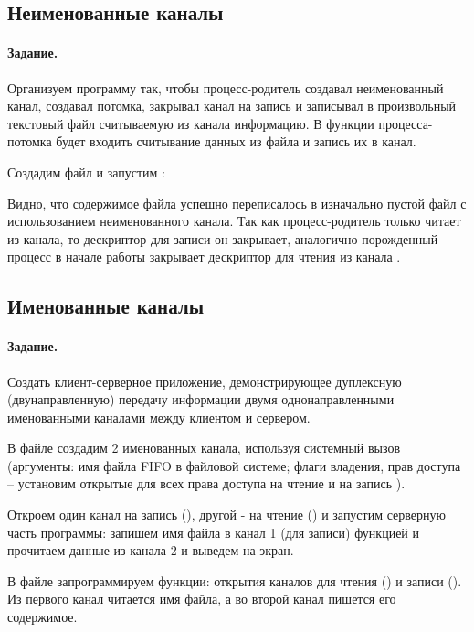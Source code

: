 \subsection{Неименованные каналы}

\paragraph{Задание.} Организуем программу  так, чтобы процесс-родитель создавал неименованный канал, создавал потомка, закрывал канал на запись и записывал в произвольный текстовый файл считываемую из канала информацию. В функции процесса-потомка будет входить считывание данных из файла и запись их в канал.


Создадим файл  и запустим :


Видно, что содержимое файла  успешно переписалось в изначально пустой файл  с использованием неименованного канала. Так как процесс-родитель только читает из канала, то дескриптор для записи  он закрывает, аналогично порожденный процесс в начале работы закрывает дескриптор для чтения из канала .

\subsection{Именованные каналы}

\paragraph{Задание.} Создать клиент-серверное приложение, демонстрирующее дуплексную (двунаправленную) передачу информации двумя однонаправленными именованными каналами между клиентом и сервером.

В файле  создадим 2 именованных канала, используя системный вызов  (аргументы: имя файла FIFO в файловой системе; флаги владения,
прав доступа -- установим открытые для всех права доступа на чтение и на
запись ).

Откроем один канал на запись (), другой - на чтение () и запустим серверную часть программы: запишем имя файла в канал 1 (для записи) функцией  и прочитаем данные из канала 2 и выведем на экран.

В файле  запрограммируем функции: открытия каналов для чтения
() и записи (). Из первого канал читается имя файла, а во второй канал пишется его содержимое.

